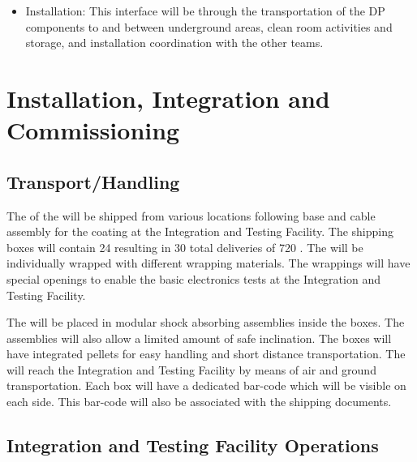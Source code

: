 \begin{itemize}
\item Installation: This interface will be through the transportation of the DP  components to and between underground areas, clean room activities and storage, and installation coordination with the other teams. 

\end{itemize}

\section{Installation, Integration and Commissioning}
\label{sec:fddp-pd-9}

\subsection{Transport/Handling}
\label{sec:fddp-pd-9.1}

The  of the  will be shipped from various locations following base and cable assembly for the  coating at the Integration and Testing Facility. The shipping boxes will contain \num{24}  resulting in \num{30} total deliveries of \num{720} . The  will be individually wrapped with different wrapping materials. The wrappings will have special openings to enable the basic electronics tests at the Integration and Testing Facility.

The  will be placed in modular shock absorbing assemblies inside the boxes. The assemblies will also allow a limited amount of safe inclination. The boxes will have integrated pellets for easy handling and short distance transportation. The  will reach the Integration and Testing Facility by means of air and ground transportation. Each box will have a dedicated bar-code which will be visible on each side. This bar-code will also be associated with the shipping documents. 

\subsection{Integration and Testing Facility Operations}
\label{sec:fddp-pd-9.2}


